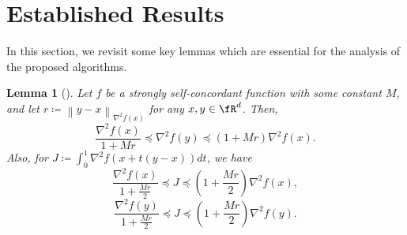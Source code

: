 \documentclass[letterpaper]{article} %
\theoremstyle{plain}
\newtheorem{lemma}[theorem]{Lemma}
\theoremstyle{definition}
\theoremstyle{remark}
\newcommand\norm[1]{\left\lVert#1\right\rVert}
\begin{document}
\section{Established Results} \label{appendix:key_lemmas}
In this section, we revisit some key lemmas which are essential for the analysis of the proposed algorithms. 
\begin{lemma}[\citet{rodomanov2021greedy}]
    Let $f$ be a strongly self-concordant function with some constant $M$, and let $r \coloneqq   \norm{y - x}_{\nabla^2 f(x)} $ for any $x, y \in \fR^d$. Then,
    \begin{equation}
        \frac{\nabla^2 f(x)}{1 + Mr} \preceq \nabla^2 f(y) \preceq (1 + M r) \nabla^2 f(x).
        \label{matrix_approx_1}
    \end{equation}
    Also, for $J \coloneqq \int_{0}^1 \nabla^2 f(x + t(y - x))dt$, we have
    \begin{equation}
        \frac{\nabla^2 f(x)}{1 + \frac{M r}{2}} \preceq J \preceq \left(1 + \frac{M r}{2}\right) \nabla^2 f(x),
    \end{equation}
    \begin{equation}
        \frac{\nabla^2 f(y)}{1 + \frac{Mr}{2}} \preceq J \preceq \left(1 + \frac{M r}{2}\right)\nabla^2 f(y).
    \end{equation}
    \label{lemma:matrix_approx}
\end{lemma}
\end{document}
